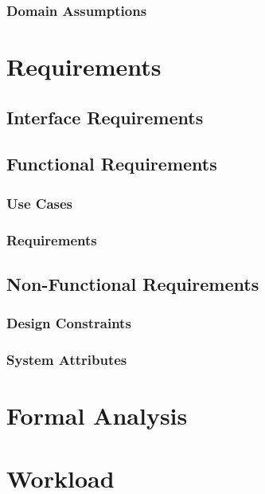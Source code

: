 \documentclass[a4paper, oneside]{book}
\begin{document}
\subsection{Domain Assumptions}

\chapter{Requirements}
\section{Interface Requirements}
\section{Functional Requirements}
\subsection{Use Cases}
\subsection{Requirements}
\section{Non-Functional Requirements}
\subsection{Design Constraints}
\subsection{System Attributes}

\chapter{Formal Analysis}

\chapter{Workload}


\end{document}
